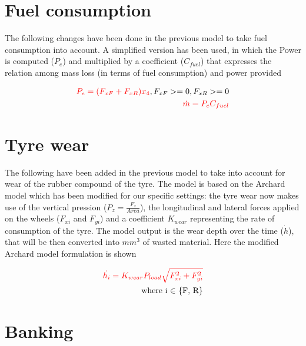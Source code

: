 \documentclass{report}
\let\Oldsection\section
\renewcommand{\section}{\FloatBarrier\Oldsection}
\begin{document}
\section{Fuel consumption}

The \color{red} following \color{black} changes have been done in the previous model to take fuel consumption into account. A simplified version has been used, in which the Power is computed ($P_e$) and multiplied by a coefficient ($C_{fuel}$) that expresses the relation among mass loss (in terms of fuel consumption) and power provided

\begin{equation}
\begin{aligned}
\color{red} P_e = (F_{xF} + F_{xR}) x_4 \color{black}, F_{xF}>=0, F_{xR}>=0 \\
\color{red} \dot{m} = P_e C_{fuel} \color{black}\\
\end{aligned}
\end{equation}

\section{Tyre wear}

The \color{red} following \color{black} have been added in the previous model to take into account for wear of the rubber compound of the tyre. The model is based on the Archard model which has been modified for our specific settings: the tyre wear now makes use of the vertical pression ($P_z = \frac{F_z}{Area}$), the longitudinal and lateral forces applied on the wheels ($F_{xi}$ and $F_{yi}$) and a coefficient $K_{wear}$ representing the rate of consumption of the tyre. The model output is the wear depth over the time ($\dot{h}$), that will be then converted into $mm^3$ of wasted material.
Here the modified Archard model formulation is shown

\begin{equation}
\begin{aligned}
\color{red} \dot{h_i} = K_{wear} P_{load} \sqrt{F_{xi}^2+F_{yi}^2} \color{black}\\
\text{where i $\in$ \{F, R\}}
\end{aligned}
\end{equation}

\section{Banking}
\end{document}
